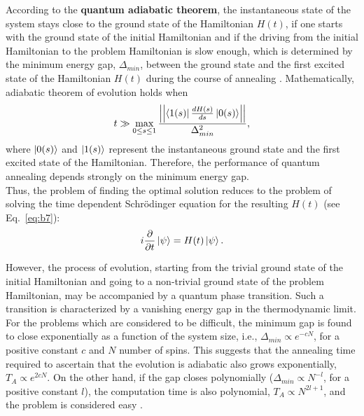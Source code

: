 \documentclass[../main.tex]{subfiles}
\begin{document}
According to the \textbf{quantum adiabatic theorem}, the instantaneous state of the system stays close to the ground state of the Hamiltonian $H(t)$, if one starts with the ground state of the initial Hamiltonian and if the driving from the initial Hamiltonian to the problem Hamiltonian is slow enough, which is determined by the minimum energy gap, $\Delta_{min}$, between the ground state and the first excited state of the Hamiltonian $H(t)$ during the course of annealing \cite{born1928beweis,kato1950adiabatic,farhi2000quantum}. Mathematically, adiabatic theorem of evolution holds when 
\begin{equation}
t \gg \max\limits_{0 \leq s \leq 1} \frac{\left| \left| \bra{1(s)}\frac{dH(s)}{ds}\ket{0(s)}\right| \right|}{\Delta_{min}^2}, \label{eq:b8}
\end{equation}
where $\ket{0(s)}$ and $\ket{1(s)}$ represent the instantaneous ground state and the first excited state of the Hamiltonian. Therefore, the performance of quantum annealing depends strongly on the minimum energy gap.\\
Thus, the problem of finding the optimal solution reduces to the problem of solving the time dependent Schr{\"o}dinger equation for the resulting $H(t)$ (see Eq.~\ref{eq:b7}):
\begin{equation}
i\frac{\partial}{\partial t}\ket{\psi}=H(t)\ket{\psi}.    \label{eq:b9}
\end{equation}

However, the process of evolution, starting from the trivial ground state of the initial Hamiltonian and going to a non-trivial ground state of the problem Hamiltonian, may be accompanied by a quantum phase transition. Such a transition is characterized by a vanishing energy gap in the thermodynamic limit. For the problems which are considered to be difficult, the minimum gap is found to close exponentially as a function of the system size, i.e., $\Delta_{min} \propto e^{-cN}$, for a positive constant $c$ and $N$ number of spins. This suggests that the annealing time required to ascertain that the evolution is adiabatic also grows exponentially, $T_A \propto e^{2cN}$. On the other hand, if the gap closes polynomially ($\Delta_{min} \propto N^{-l}$, for a positive constant $l$), the computation time is also polynomial, $T_A \propto N^{2l+1}$, and the problem is considered easy \cite{hauke2019perspectives}.
\end{document}
